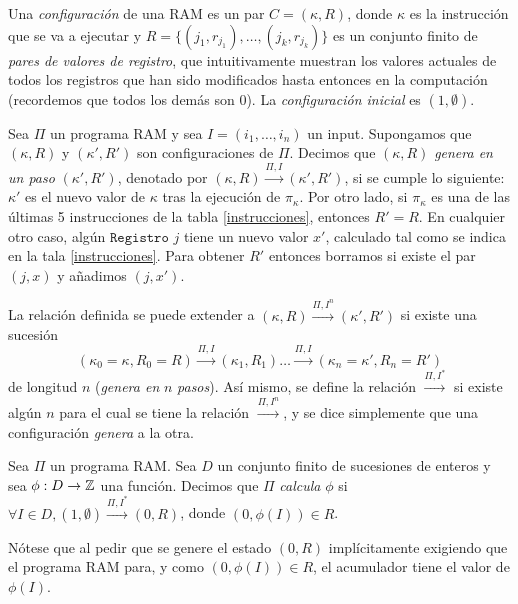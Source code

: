 \documentclass[twoside]{article}
\newcommand{\yields}{\overset{\Pi,I^*}{\rightarrow}}
\begin{document}
\begin{defi}
Una \emph{configuración} de una RAM es un par $C=(\kappa,R)$, donde $\kappa$ es la instrucción que se va a ejecutar y $R=\{(j_1,r_{j_1}),\dots,(j_k,r_{j_k})\}$ es un conjunto finito de \emph{pares de valores de registro}, que intuitivamente muestran los valores actuales de todos los registros que han sido modificados hasta entonces en la computación (recordemos que todos los demás son 0). La \emph{configuración inicial} es $(1,\emptyset)$.
\end{defi}

\newpage

\begin{defi}
Sea $\Pi$ un programa RAM y sea $I=(i_1,\dots,i_n)$ un input. Supongamos que $(\kappa,R)$ y $(\kappa',R')$ son configuraciones de $\Pi$. Decimos que $(\kappa,R)$ \emph{genera en un paso} $(\kappa',R')$, denotado por $(\kappa,R)\overset{\Pi,I}{\rightarrow}(\kappa',R')$, si se cumple lo siguiente: $\kappa'$ es el nuevo valor de $\kappa$ tras la ejecución de $\pi_\kappa$. Por otro lado, si $\pi_\kappa$ es una de las últimas 5 instrucciones de la tabla \ref{instrucciones}, entonces $R'=R$. En cualquier otro caso, algún $\texttt{Registro }j$ tiene un nuevo valor $x'$, calculado tal como se indica en la tala \ref{instrucciones}. Para obtener $R'$ entonces borramos si existe el par $(j,x)$ y añadimos $(j,x')$. 

La relación definida se puede extender a  $(\kappa,R)\overset{\Pi,I^n}{\rightarrow}(\kappa',R')$ si existe una sucesión  $$(\kappa_0=\kappa,R_0=R)\overset{\Pi,I}{\rightarrow} (\kappa_1,R_1)\dots\overset{\Pi,I}{\rightarrow}(\kappa_n=\kappa',R_n=R')$$ de longitud $n$ (\emph{genera en }$n$\emph{ pasos}). Así mismo, se define la relación $\overset{\Pi,I^*}{\rightarrow}$ si existe algún $n$ para el cual se tiene la relación $\overset{\Pi,I^n}{\rightarrow}$, y se dice simplemente que una configuración \emph{genera} a la otra.
\end{defi}

\begin{defi}
Sea $\Pi$ un programa RAM. Sea $D$ un conjunto finito de sucesiones de enteros y sea $\phi:D\to\mathbb{Z}$ una función. Decimos que $\Pi$ \emph{calcula} $\phi$ si $\forall I\in D, (1,\emptyset)\yields(0,R)$, donde $(0,\phi(I))\in R$. 
\end{defi}

Nótese que al pedir que se genere el estado $(0,R)$ implícitamente exigiendo que el programa RAM para, y como $(0,\phi(I))\in R$, el acumulador tiene el valor de $\phi(I)$. 
\end{document}

